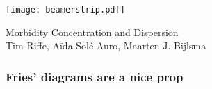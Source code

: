 \documentclass[20pt]{beamer}
\begin{document}


\begin{frame}[plain]
	\vspace{-4.4cm}
 \centerline{\texttt{[image: beamerstrip.pdf]}}

	
	\huge
	\vspace{1em}
	
	Morbidity Concentration and Dispersion \\
	\vspace{1em}
	\large 
	Tim Riffe, A{\"i}da Sol\'{e} Auro, Maarten J. Bijlsma
\end{frame}

\begin{frame}
\frametitle{Fries' diagrams are a nice prop}
\begin{center}
\end{center}
\end{frame}


%
\end{document}
